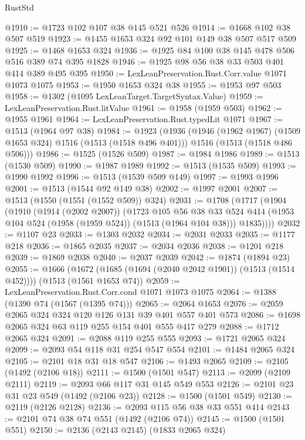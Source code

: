 \begin{lexlean}{RustStd}
\begin{coremodule}
{\begin{coremodule}
{{{{{{{{@1910 := @1723 @102 @107 @38 @145 @521 @526
@1914 := @1668 @102 @38 @507 @519
@1923 := @1455 @1653 @324 @92 @101 @149 @38 @507 @517 @509
@1925 := @1468 @1653 @324
@1936 := @1925 @84 @100 @38 @145 @478 @506 @516 @389 @74 @395 @1828
@1946 := @1925 @98 @56 @38 @33 @503 @401 @414 @389 @495 @395
@1950 := LexLeanPreservation.Rust.Corr.value @1071 @1073 @1075
@1953 := @1950 @1653 @324 @38
@1955 := @1953 @97 @503
@1958 := @1302 (@1095 LexLeanTarget.TargetSyntax.Value)
@1959 := LexLeanPreservation.Rust.litValue
@1961 := @1958 (@1959 @503)
@1962 := @1955 @1961
@1964 := LexLeanPreservation.Rust.typedLit @1071
@1967 := @1513 (@1964 @97 @38)
@1984 := @1923
    (@1936
      (@1946 (@1962 @1967) (@1509 @1653 @324) @1516 (@1513 (@1518 @496 @401)))
      @1516
      (@1513 (@1518 @486 @506)))
@1986 := @1525 (@1526 @509)
@1987 := @1984 @1986
@1989 := @1513 (@1530 @509)
@1990 := @1987 @1989
@1992 := @1513 (@1535 @509)
@1993 := @1990 @1992
@1996 := @1513 (@1539 @509 @149)
@1997 := @1993 @1996
@2001 := @1513 (@1544 @92 @149 @38)
@2002 := @1997 @2001
@2007 := @1513 (@1550 (@1551 (@1552 @509)) @324)
@2031 := @1708
    (@1717
      (@1904
        (@1910
          (@1914 (@2002 @2007))
          (@1723
            @105
            @56
            @38
            @33
            @524
            @414
            (@1953 @104 @524 (@1958 (@1959 @524)) (@1513 (@1964 @104 @38)))
            @1835))))
@2032 := @1107 @23
@2033 := @1303 @2032
@2034 := @2031 @2033
@2035 := @1177 @218
@2036 := @1865 @2035
@2037 := @2034 @2036
@2038 := @1201 @218
@2039 := @1869 @2038
@2040 := @2037 @2039
@2042 := @1874 (@1894 @23)
@2055 := @1666
    (@1672 (@1685 (@1694 (@2040 @2042 @1901)) (@1513 (@1514 @452))))
    (@1513 (@1561 @1653 @74))
@2059 := LexLeanPreservation.Rust.Corr.cond @1071 @1073 @1075
@2064 := @1388 (@1390 @74 (@1567 (@1395 @74)))
@2065 := @2064 @1653
@2076 := @2059 @2065 @324 @324 @120 @126 @131 @39 @401 @557 @401 @573
@2086 := @1698 @2065 @324 @63 @119 @255 @154 @401 @555 @417 @279
@2088 := @1712 @2065 @324
@2091 := @2088 @119 @255 @555
@2093 := @1721 @2065 @324
@2099 := @2093 @54 @118 @31 @254 @547 @554
@2101 := @1484 @2065 @324
@2105 := @2101 @18 @31 @18 @547
@2106 := @1493 @2065
@2109 := @2105 (@1492 (@2106 @18))
@2111 := @1500 (@1501 @547)
@2113 := @2099 (@2109 @2111)
@2119 := @2093 @66 @117 @31 @145 @549 @553
@2126 := @2101 @23 @31 @23 @549 (@1492 (@2106 @23))
@2128 := @1500 (@1501 @549)
@2130 := @2119 (@2126 @2128)
@2136 := @2093 @115 @56 @38 @33 @551 @414
@2143 := @2101 @74 @38 @74 @551 (@1492 (@2106 @74))
@2145 := @1500 (@1501 @551)
@2150 := @2136 (@2143 @2145) (@1833 @2065 @324)
}}}}}}}}
\end{coremodule}}
\end{coremodule}
\end{lexlean}
